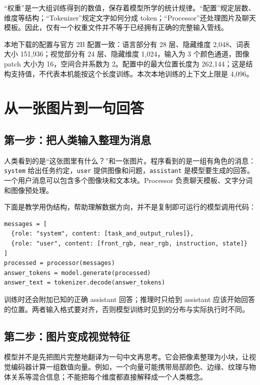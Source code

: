 “权重”是一大组训练得到的数值，保存着模型所学的统计规律。“配置”规定层数、维度等结构；“Tokenizer”规定文字如何分成 token；“Processor”还处理图片及聊天模板。因此，仅有一个权重文件并不等于已经拥有正确的完整输入管线。

本地下载的配置与官方 2B 配置一致：语言部分有 28 层、隐藏维度 2,048、词表大小 151,936；视觉部分有 24 层、隐藏维度 1,024，输入为 3 个颜色通道，图像 patch 大小为 16，空间合并系数为 2。配置中的最大位置长度为 262,144；这是结构支持值，不代表本机能按这个长度训练。本次本地训练的上下文上限是 4,096。\cite{qwen-config}

\section{从一张图片到一句回答}

\subsection{第一步：把人类输入整理为消息}

人类看到的是“这张图里有什么？”和一张图片。程序看到的是一组有角色的消息：\texttt{system} 给出任务约定，\texttt{user} 提供图像和问题，\texttt{assistant} 是模型要生成的回答。一个用户消息可以包含多个图像块和文本块。Processor 负责聊天模板、文字分词和图像预处理。\cite{multimodal-template}

下面是教学用伪结构，帮助理解数据方向，并不是复制即可运行的模型调用代码：

\begin{Verbatim}[breaklines=true,fontsize=\small]
messages = [
  {role: "system", content: [task_and_output_rules]},
  {role: "user", content: [front_rgb, near_rgb, instruction, state]}
]
processed = processor(messages)
answer_tokens = model.generate(processed)
answer_text = tokenizer.decode(answer_tokens)
\end{Verbatim}

训练时还会附加已知的正确 assistant 回答；推理时只给到 assistant 应该开始回答的位置。两者输入格式要对齐，否则模型训练时见到的分布与实际执行时不同。

\subsection{第二步：图片变成视觉特征}

模型并不是先把图片完整地翻译为一句中文再思考。它会把像素整理为小块，让视觉编码器计算一组数值向量。例如，一个向量可能携带局部颜色、边缘、纹理与物体关系等混合信息；不能把每个维度都直接解释成一个人类概念。

